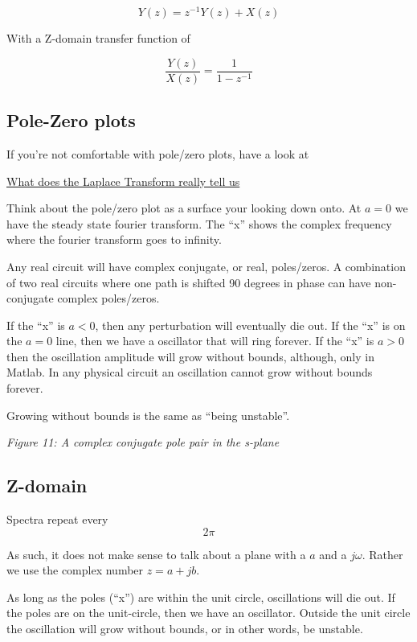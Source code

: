 \[Y(z) = z^{-1}Y(z) + X(z) \]

With a Z-domain transfer function of

\[\frac{Y(z)}{X(z)} = \frac{1}{1 - z^{-1}}\]

\subsection{Pole-Zero plots}\label{pole-zero-plots}

If you're not comfortable with pole/zero plots, have a look at

\href{https://www.youtube.com/watch?v=n2y7n6jw5d0}{What does the Laplace
Transform really tell us}

Think about the pole/zero plot as a surface your looking down onto. At
\(a = 0\) we have the steady state fourier transform. The ``x'' shows
the complex frequency where the fourier transform goes to infinity.

Any real circuit will have complex conjugate, or real, poles/zeros. A
combination of two real circuits where one path is shifted 90 degrees in
phase can have non-conjugate complex poles/zeros.

If the ``x'' is \(a<0\), then any perturbation will eventually die out.
If the ``x'' is on the \(a=0\) line, then we have a oscillator that will
ring forever. If the ``x'' is \(a>0\) then the oscillation amplitude
will grow without bounds, although, only in Matlab. In any physical
circuit an oscillation cannot grow without bounds forever.

Growing without bounds is the same as ``being unstable''.


{
\centering
{}
}

\emph{Figure 11: A complex conjugate pole pair in the s-plane}

\subsection{Z-domain}\label{z-domain}

Spectra repeat every \[2\pi\]

As such, it does not make sense to talk about a plane with a \(a\) and a
\(j\omega\). Rather we use the complex number \(z = a + jb\).

As long as the poles (``x'') are within the unit circle, oscillations
will die out. If the poles are on the unit-circle, then we have an
oscillator. Outside the unit circle the oscillation will grow without
bounds, or in other words, be unstable.


